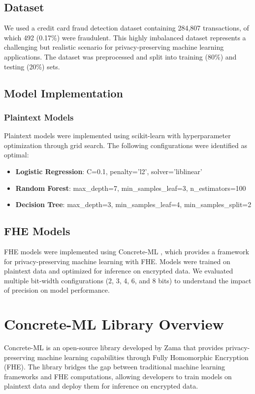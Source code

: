 \documentclass[a4paper,12pt]{article}
\begin{document}
\subsection{Dataset}
We used a credit card fraud detection dataset containing 284,807 transactions, of which 492 (0.17\%) were fraudulent. This highly imbalanced dataset represents a challenging but realistic scenario for privacy-preserving machine learning applications. The dataset was preprocessed and split into training (80\%) and testing (20\%) sets.

\subsection{Model Implementation}

\subsubsection{Plaintext Models}
Plaintext models were implemented using scikit-learn with hyperparameter optimization through grid search. The following configurations were identified as optimal:

\begin{itemize}
    \item \textbf{Logistic Regression}: C=0.1, penalty='l2', solver='liblinear'
    \item \textbf{Random Forest}: max\_depth=7, min\_samples\_leaf=3, n\_estimators=100
    \item \textbf{Decision Tree}: max\_depth=3, min\_samples\_leaf=4, min\_samples\_split=2
\end{itemize}

\subsection{FHE Models}
FHE models were implemented using Concrete-ML \cite{concrete-ml}, which provides a framework for privacy-preserving machine learning with FHE. Models were trained on plaintext data and optimized for inference on encrypted data. We evaluated multiple bit-width configurations (2, 3, 4, 6, and 8 bits) to understand the impact of precision on model performance.

\section{Concrete-ML Library Overview}
Concrete-ML is an open-source library developed by Zama that provides privacy-preserving machine learning capabilities through Fully Homomorphic Encryption (FHE). The library bridges the gap between traditional machine learning frameworks and FHE computations, allowing developers to train models on plaintext data and deploy them for inference on encrypted data.
\end{document}
